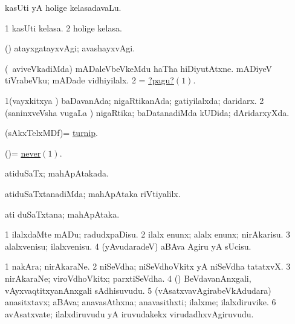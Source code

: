 \bentry
{}
\gl{\nA}
\bmng
kasUti yA holige kelasadavaLu. 
\emng
\eentry

\bentry
{}
\gl{\nA}
\bmng
\bnum
\num{1} kasUti kelasa. 
\num{2} holige kelasa. 
\enum
\emng
\eentry

\bentry
{}
\gl{\kirxvi}
\bmng
(\pArxparx) atayxgatayxvAgi; avashayxvAgi. 
\emng

\noindent
\gl{\pagu}
\bmng
\hypertarget{needspagu1}{} 
\bnum
{}  
\banum
{} (\sA\ aviveVkadiMda) mADaleVbeVkeMdu haTha hiDiyutAtxne. 
 mADiyeV tiVrabeVku; mADade vidhiyilalx. 
\eanum
\numie
\num{2} = \hyperlink{needspagu1}{?pagu?\((1)\)}. 
\enum
\emng
\eentry

\bentry
{}
\gl{\gu}
\bmng
\bnum
\num{1}(vayxkitxya \vi) baDavanAda; nigaRtikanAda; gatiyilalxda; daridarx. 
\num{2} (saninxveVsha \mo vugaLa \vi) nigaRtika; baDatanadiMda kUDida; dAridarxyXda. 
\enum
\emng
\eentry

\bentry
{}
\gl{\nA}
\bmng
(sAkxTelxMDf)= \hyperref{kandict_t.pdf}{T}{turnip}{turnip}. 
\emng
\eentry

\bentry
{}
\gl{\kirxvi}
\bmng
(\kAparx)= \hyperlink{never}{never\((1)\)}. 
\emng
\eentry

\bentry
{}
\gl{\gu}
\bmng
atiduSaTx; mahApAtakada. 
\emng
\eentry

\bentry
{}
\gl{\nA}
\bmng
atiduSaTxtanadiMda; mahApAtaka riVtiyalilx. 
\emng
\eentry

\bentry
{}
\gl{\nA}
\bmng
ati duSaTxtana; mahApAtaka. 
\emng
\eentry

\bentry
{}
\gl{\saMkiSx}
\bmng
{} 
\emng
\eentry

\bentry
{}
\gl{\sakirx}
\bmng
\bnum
\num{1} ilalxdaMte mADu; radudxpaDisu. 
\num{2} ilalx enunx; alalx enunx; nirAkarisu. 
\num{3} alalxvenisu; ilalxvenisu. 
\num{4} (yAvudaradeV) aBAva Agiru yA sUcisu. 
\enum
\emng
\eentry

\bentry
{}
\gl{\nA}
\bmng
\bnum
\num{1} nakAra; nirAkaraNe. 
\num{2} niSeVdha; niSeVdhoVkitx yA niSeVdha tatatxvX. 
\num{3} nirAkaraNe; viroVdhoVkitx; parxtiSeVdha. 
\hypertarget{negation(4)}{} 
\num{4} (\takaR) BeVdavanAnxgali, vAyxvaqtitxyanAnxgali sAdhisuvudu. 
\num{5} (vAsatxvavAgirabeVkAdudara) anasitxtavx; aBAva; anavasAthxna; anavasithxti; ilalxme; ilalxdiruvike. 
\num{6} avAsatxvate; ilalxdiruvudu yA iruvudakekx virudadhxvAgiruvudu. 
\enum
\emng
\eentry

